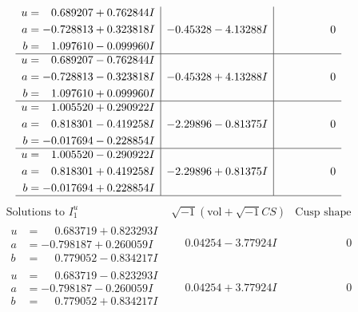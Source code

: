 \documentclass[1p]{elsarticle_modified}
\theoremstyle{definition}
\newcommand{\I}{\sqrt{-1}}
\begin{document}
$$\begin{array}{c|c|c}
\begin{aligned}
u &= \phantom{-}0.689207 + 0.762844 I \\
a &= -0.728813 + 0.323818 I \\
b &= \phantom{-}1.097610 - 0.099960 I\end{aligned}
 & -0.45328 - 4.13288 I & \phantom{-0.000000 } 0 \\ \hline\begin{aligned}
u &= \phantom{-}0.689207 - 0.762844 I \\
a &= -0.728813 - 0.323818 I \\
b &= \phantom{-}1.097610 + 0.099960 I\end{aligned}
 & -0.45328 + 4.13288 I & \phantom{-0.000000 } 0 \\ \hline\begin{aligned}
u &= \phantom{-}1.005520 + 0.290922 I \\
a &= \phantom{-}0.818301 - 0.419258 I \\
b &= -0.017694 - 0.228854 I\end{aligned}
 & -2.29896 - 0.81375 I & \phantom{-0.000000 } 0 \\ \hline\begin{aligned}
u &= \phantom{-}1.005520 - 0.290922 I \\
a &= \phantom{-}0.818301 + 0.419258 I \\
b &= -0.017694 + 0.228854 I\end{aligned}
 & -2.29896 + 0.81375 I & \phantom{-0.000000 } 0\\
 \hline 
 \end{array}$$\newpage$$\begin{array}{c|c|c}  
\text{Solutions to }I^u_{1}& \I (\text{vol} + \sqrt{-1}CS) & \text{Cusp shape}\\
 \hline 
\begin{aligned}
u &= \phantom{-}0.683719 + 0.823293 I \\
a &= -0.798187 + 0.260059 I \\
b &= \phantom{-}0.779052 - 0.834217 I\end{aligned}
 & \phantom{-}0.04254 - 3.77924 I & \phantom{-0.000000 } 0 \\ \hline\begin{aligned}
u &= \phantom{-}0.683719 - 0.823293 I \\
a &= -0.798187 - 0.260059 I \\
b &= \phantom{-}0.779052 + 0.834217 I\end{aligned}
 & \phantom{-}0.04254 + 3.77924 I & \phantom{-0.000000 } 0 \\ \hline\begin{aligned}

\end{aligned}
\end{array}$$
\end{document}
